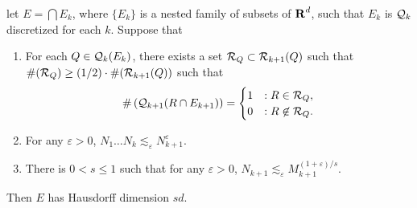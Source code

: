 \begin{theorem} \label{TheConstructionTheorem}
	let $E = \bigcap E_k$, where $\{ E_k \}$ is a nested family of subsets of $\operatorname{\mathbf{R}}^d$, such that $E_k$ is $\operatorname{\mathcal{Q}}_k$ discretized for each $k$. Suppose that 
	\begin{enumerate}
		\item \label{SingleSelection} For each $Q \in \operatorname{\mathcal{Q}}_k(E_k)$, there exists a set $\mathcal{R}_Q \subset \operatorname{\mathcal{R}}_{k+1}(Q)$ such that $\#(\mathcal{R}_Q) \geq (1/2) \cdot \#(\operatorname{\mathcal{R}}_{k+1}(Q))$ such that
		\[ \# \left( \operatorname{\mathcal{Q}}_{k+1}(R \cap E_{k+1}) \right) = \begin{cases} 1 & : R \in \mathcal{R}_Q, \\ 0 & : R \not \in \mathcal{R}_Q. \end{cases} \]

		\item \label{RapidDecrease} For any $\varepsilon > 0$, $N_1 \dots N_k \lesssim_\varepsilon N_{k+1}^\varepsilon$.

		\item \label{ChangeofScales} There is $0 < s \leq 1$ such that for any $\varepsilon > 0$, $N_{k+1} \lesssim_\varepsilon M_{k+1}^{(1 + \varepsilon)/s}$.
	\end{enumerate}
	Then $E$ has Hausdorff dimension $sd$.
\end{theorem}
